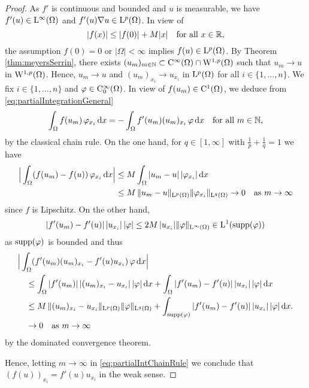 \begin{proof}
  As $f'$ is continuous and bounded and $u$ is measurable, we have $f'(u)\in \mathrm{L}^\infty(\Omega)$ and $f'(u) \nabla u \in \mathrm{L}^p(\Omega)$.
  In view of 
  $$
  |f(x)| \leq |f(0)| + M|x| \quad\text{for all } x \in \mathbb{R},
  $$
  the assumption $f(0)= 0$ or $|\Omega| < \infty$ implies $f(u) \in \mathrm{L}^p(\Omega)$.
  By Theorem \ref{thm:meyersSerrin}, there exists $(u_m)_{m \in \mathbb{N}} \subset \mathrm{C}^\infty(\Omega) \cap \mathrm{W}^{1,p}(\Omega)$ such that $u_m \to u$ in $\mathrm{W}^{1,p}(\Omega)$. 
  Hence, $u_m \to u$ and $(u_m)_{x_i} \to u_{x_i}$ in $\mathrm{L}^p(\Omega)$ for all $i \in \{1,\dots,n\}$.
  We fix $i \in \{ 1, \dots, n\}$ and $\varphi \in \mathrm{C}_0^\infty(\Omega)$.
  In view of $f(u_m) \in \mathrm{C}^1(\Omega)$, we deduce from \eqref{eq:partialIntegrationGeneral}
  \begin{equation}
    \label{eq:partialIntChainRule}
    \int_\Omega f(u_m) \, \varphi_{x_i} \, {\operatorname{d}\!{x}} = -\int_\Omega f'(u_m) (u_m)_{x_i} \,  \varphi \, {\operatorname{d}\!{x}} \quad\text{for all } m \in \mathbb{N},
  \end{equation}
  by the classical chain rule.
  On the one hand, for $q \in [1,\infty]$ with $\frac{1}{p} + \frac{1}{q} = 1$  we have
  \begin{align*}
    \Big| \int_\Omega (f(u_m) - f(u))\, \varphi_{x_i} \, {\operatorname{d}\!{x}} \Big|
    &\leq M \int_{\Omega} |u_m - u|\, |\varphi_{x_i}| \, {\operatorname{d}\!{x}} \\
    &\leq M\, \|u_m - u\|_{\mathrm{L}^p(\Omega)} \|\varphi_{x_i}\|_{\mathrm{L}^q(\Omega)} 
    \to 0 \quad\text{as } m \to \infty
  \end{align*}
  since $f$ is Lipschitz.
  On the other hand, 
  $$
  |f'(u_m) - f'(u)|\, |u_{x_i}|\, |\varphi| \leq 2M\, |u_{x_i}| \|\varphi\|_{\mathrm{L}^\infty(\Omega)} \in \mathrm{L}^1(\operatorname{supp}(\varphi))
  $$
  as $\operatorname{supp}(\varphi)$ is bounded and thus
  \begin{align*}
    &\Big |\int_\Omega (f'(u_m) (u_m)_{x_i} - f'(u)u_{x_i})\, \varphi \, {\operatorname{d}\!{x}} \Big| \\
    &\quad\leq \int_\Omega |f'(u_m)|\, |(u_m)_{x_i} - u_{x_i}|\,| \varphi | \, {\operatorname{d}\!{x}} 
    + \int_\Omega |f'(u_m) - f'(u)|\, |u_{x_i}|\, |\varphi| \, {\operatorname{d}\!{x}} \\
    &\quad\leq M\, \|(u_m)_{x_i} - u_{x_i}\|_{\mathrm{L}^p(\Omega)} \|\varphi\|_{\mathrm{L}^q(\Omega)}
    + \int_{\operatorname{supp}(\varphi)} |f'(u_m) - f'(u)|\, |u_{x_i}|\, |\varphi| \, {\operatorname{d}\!{x}} .
    \\&\quad \to 0 \quad\text{as } m \to \infty
  \end{align*}
   by the dominated convergence theorem.

   Hence, letting $m \to \infty$ in \eqref{eq:partialIntChainRule}  we conclude that $(f(u))_{x_i} = f'(u)u_{x_i}$ in the weak sense.
\end{proof}

